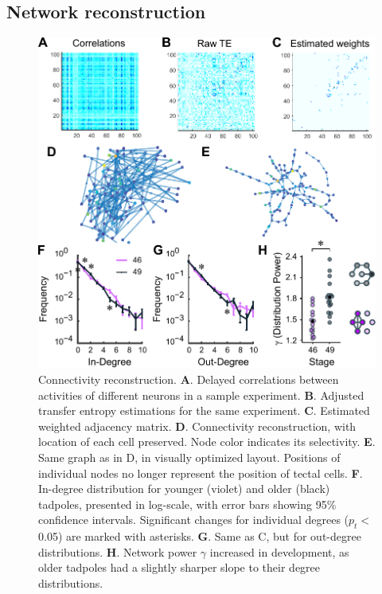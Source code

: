 \documentclass{article}
\begin{document}
\subsection*{Network reconstruction}

\begin{figure}[t!]
\includegraphics[width=\linewidth]{fig4.pdf}
\caption{
Connectivity reconstruction.  \textbf{A}. Delayed correlations between activities of different neurons in a sample experiment. \textbf{B}. Adjusted transfer entropy estimations for the same experiment. \textbf{C}. Estimated weighted adjacency matrix. \textbf{D}. Connectivity reconstruction, with location of each cell preserved. Node color indicates its selectivity. \textbf{E}. Same graph as in D, in visually optimized layout. Positions of individual nodes no longer represent the position of tectal cells. \textbf{F}. In-degree distribution for younger (violet) and older (black) tadpoles, presented in log-scale, with error bars showing 95\% confidence intervals. Significant changes for individual degrees ($p_t<$ 0.05) are marked with asterisks. \textbf{G}. Same as C, but for out-degree distributions. \textbf{H}. Network power $\gamma$ increased in development, as older tadpoles had a slightly sharper slope to their degree distributions. }
\end{figure}
\end{document}
